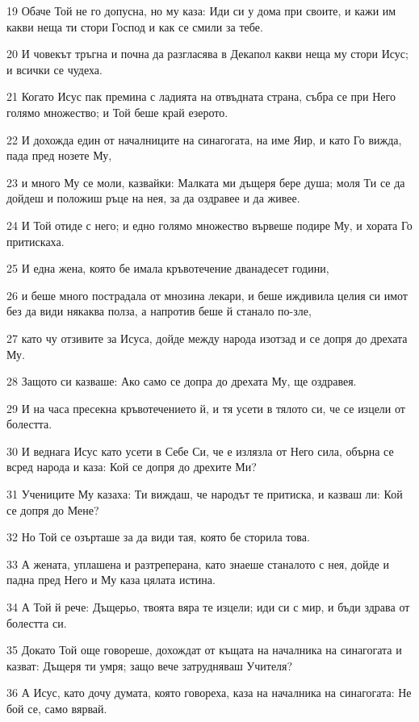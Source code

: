 \par 19 Обаче Той не го допусна, но му каза: Иди си у дома при своите, и кажи им какви неща ти стори Господ и как се смили за тебе.
\par 20 И човекът тръгна и почна да разгласява в Декапол какви неща му стори Исус; и всички се чудеха.
\par 21 Когато Исус пак премина с ладията на отвъдната страна, събра се при Него голямо множество; и Той беше край езерото.
\par 22 И дохожда един от началниците на синагогата, на име Яир, и като Го вижда, пада пред нозете Му,
\par 23 и много Му се моли, казвайки: Малката ми дъщеря бере душа; моля Ти се да дойдеш и положиш ръце на нея, за да оздравее и да живее.
\par 24 И Той отиде с него; и едно голямо множество вървеше подире Му, и хората Го притискаха.
\par 25 И една жена, която бе имала кръвотечение дванадесет години,
\par 26 и беше много пострадала от мнозина лекари, и беше иждивила целия си имот без да види някаква полза, а напротив беше й станало по-зле,
\par 27 като чу отзивите за Исуса, дойде между народа изотзад и се допря до дрехата Му.
\par 28 Защото си казваше: Ако само се допра до дрехата Му, ще оздравея.
\par 29 И на часа пресекна кръвотечението й, и тя усети в тялото си, че се изцели от болестта.
\par 30 И веднага Исус като усети в Себе Си, че е излязла от Него сила, обърна се всред народа и каза: Кой се допря до дрехите Ми?
\par 31 Учениците Му казаха: Ти виждаш, че народът те притиска, и казваш ли: Кой се допря до Мене?
\par 32 Но Той се озърташе за да види тая, която бе сторила това.
\par 33 А жената, уплашена и разтреперана, като знаеше станалото с нея, дойде и падна пред Него и Му каза цялата истина.
\par 34 А Той й рече: Дъщерьо, твоята вяра те изцели; иди си с мир, и бъди здрава от болестта си.
\par 35 Докато Той още говореше, дохождат от къщата на началника на синагогата и казват: Дъщеря ти умря; защо вече затрудняваш Учителя?
\par 36 А Исус, като дочу думата, която говореха, каза на началника на синагогата: Не бой се, само вярвай.

